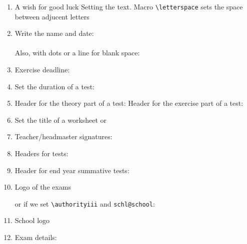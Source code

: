 \documentclass[12pt,a4page]{article}
\begin{document}
\begin{enumerate}
\item A wish for good luck
  \wish
  Setting the text. Macro \verb/\letterspace/ sets the space between adjucent letters
  \makeatletter
  \def\schl@wish{\letterspace{10} ΚΑΛΗ ΤΥΧΗ}
  \makeatother
  \wish
\item Write the name and date:\hspace{2em} \fullname{}\\
  \datefield{} \\
  Also, with dots or a line for blank space: \hspace{3em} \\ \datefield{\blankspace{10em}}
\item Exercise deadline: \hspace{3em} \\
\item Set the duration of a test:\\ 
\item Header for the theory part of a test: \theorypart
  Header for the exercise part of a test: \exercisepart
\item Set the title of a worksheet
  \worksheethd{}
  or
\item Teacher/headmaster signatures:\\
  \hfill
\item Headers for tests:
  \examhd{}
\item Header for end year summative tests:
\item Logo of the  exams

  \authoritylogo

  or if we set \verb+\authorityiii+ and \verb+schl@school+:

  \authoritylogo
\item School logo

  \subject{Μαθηματικά}
  \schoollogo{200pt}
\item Exam details:


\end{enumerate}
\end{document}
